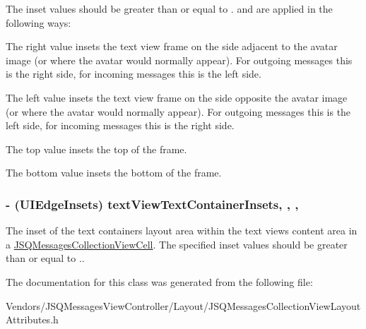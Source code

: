 The inset values should be greater than or equal to {.} and are applied in the following ways\+:


\begin{DoxyEnumerate}
\item The right value insets the text view frame on the side adjacent to the avatar image (or where the avatar would normally appear). For outgoing messages this is the right side, for incoming messages this is the left side.
\item The left value insets the text view frame on the side opposite the avatar image (or where the avatar would normally appear). For outgoing messages this is the left side, for incoming messages this is the right side.
\item The top value insets the top of the frame.
\item The bottom value insets the bottom of the frame. 
\end{DoxyEnumerate}\hypertarget{interface_j_s_q_messages_collection_view_layout_attributes_a3baa6c5c109e6a38be5c2008fe08292b}{}
\subsubsection[{text\+View\+Text\+Container\+Insets}]{\setlength{\rightskip}{0pt plus 5cm}-\/ (U\+I\+Edge\+Insets) text\+View\+Text\+Container\+Insets\hspace{0.3cm}{\ttfamily [read]}, {\ttfamily [write]}, {\ttfamily [nonatomic]}, {\ttfamily [assign]}}\label{interface_j_s_q_messages_collection_view_layout_attributes_a3baa6c5c109e6a38be5c2008fe08292b}
The inset of the text container\textquotesingle{}s layout area within the text view\textquotesingle{}s content area in a {\ttfamily \hyperlink{interface_j_s_q_messages_collection_view_cell}{J\+S\+Q\+Messages\+Collection\+View\+Cell}}. The specified inset values should be greater than or equal to {.}. 

The documentation for this class was generated from the following file\+:\begin{DoxyCompactItemize}
\item 
Vendors/\+J\+S\+Q\+Messages\+View\+Controller/\+Layout/J\+S\+Q\+Messages\+Collection\+View\+Layout\+Attributes.\+h\end{DoxyCompactItemize}
